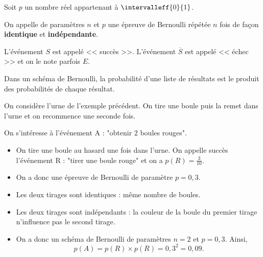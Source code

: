 \documentclass[10pt,openright,twoside,french]{book}
\begin{document}
\begin{Defi}
    Soit $p$ un nombre réel appartenant à $\intervalleff{0}{1}$.\par
    On appelle  de paramètres $n$ et $p$ une épreuve de Bernoulli répétée $n$ fois de façon \textbf{identique} et \textbf{indépendante}.\par
    L'événement $S$ est appelé << succès >>. L'événement $\overline S$ est appelé << échec >> et on le note parfois $E$.
\end{Defi}

\begin{Prop}[(admise)]
    Dans un schéma de Bernoulli, la probabilité d'une liste de résultats est le produit des probabilités de chaque résultat.
\end{Prop}

\begin{Exemple}
    On considère l'urne de l'exemple précédent. On tire une boule puis la remet dans l'urne et on recommence une seconde fois.\par
    On s'intéresse à l'événement A : "obtenir 2 boules rouges".\par
    \begin{itemize}
        \item On tire une boule au hasard une fois dans l'urne. On appelle succès l'événement R : "tirer une boule rouge" et on a $p(R) = \frac{3}{10}$.
        \item On a donc une épreuve de Bernoulli de paramètre $p = 0,3$.
        \item Les deux tirages sont identiques : même nombre de boules.
        \item Les deux tirages sont indépendants : la couleur de la boule du premier tirage n'influence pas le second tirage.
        \item On a donc un schéma de Bernoulli de paramètres $n = 2$ et $p = 0,3$. Ainsi, \[p(A) = p(R) \times p(R) = 0,3^2 = 0,09.\]
    \end{itemize}
\end{Exemple}
\end{document}
